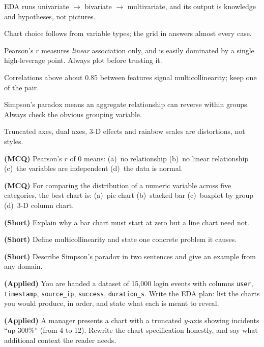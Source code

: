 \begin{chaptersummary}
\begin{tight}
  \item EDA runs univariate $\rightarrow$ bivariate $\rightarrow$ multivariate, and
        its output is knowledge and hypotheses, not pictures.
  \item Chart choice follows from variable types; the grid in
         answers almost every case.
  \item Pearson's $r$ measures \emph{linear} association only, and is easily
        dominated by a single high-leverage point. Always plot before trusting it.
  \item Correlations above about 0.85 between features signal multicollinearity;
        keep one of the pair.
  \item Simpson's paradox means an aggregate relationship can reverse within
        groups. Always check the obvious grouping variable.
  \item Truncated axes, dual axes, 3-D effects and rainbow scales are distortions,
        not styles.
\end{tight}
\end{chaptersummary}

\begin{reviewq}
  \item \textbf{(MCQ)} Pearson's $r$ of 0 means: (a)~no relationship (b)~no linear
        relationship (c)~the variables are independent (d)~the data is normal.
  \item \textbf{(MCQ)} For comparing the distribution of a numeric variable across
        five categories, the best chart is: (a)~pie chart (b)~stacked bar
        (c)~boxplot by group (d)~3-D column chart.
  \item \textbf{(Short)} Explain why a bar chart must start at zero but a line
        chart need not.
  \item \textbf{(Short)} Define multicollinearity and state one concrete problem it
        causes.
  \item \textbf{(Short)} Describe Simpson's paradox in two sentences and give an
        example from any domain.
  \item \textbf{(Applied)} You are handed a dataset of 15{,}000 login events with
        columns \texttt{user}, \texttt{timestamp}, \texttt{source\_ip},
        \texttt{success}, \texttt{duration\_s}. Write the EDA plan: list the charts
        you would produce, in order, and state what each is meant to reveal.
  \item \textbf{(Applied)} A manager presents a chart with a truncated $y$-axis
        showing incidents ``up 300\%'' (from 4 to 12). Rewrite the chart
        specification honestly, and say what additional context the reader needs.
\end{reviewq}
